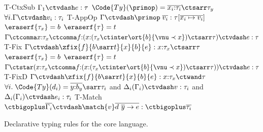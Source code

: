 \begin{figure}[h!]
{  {T-CtxSub}
  {$\Gamma_1 \ctvdash e : \tau$}
  \quad
  \mprooftr{34mm}
  {$\Code{Ty}(\primop) = \overline{x_i{:}\tau_i}\ctsarr \tau_y$ \quad 
    $\forall i. \Gamma \ctvdash v_i : \tau_i$ }
  {T-AppOp}
  {$\Gamma \ctvdash \primop\;\overline{v_i} : \tau[\overline{x_i \mapsto v_i}]$}
  \\[.8em]
  \mprooftr{64mm}
  {$\eraserf{\tau_x} = b$ \quad $\eraserf{\tau} = t$ \quad $\Gamma \ctcomma x{:}\tau_x \ctcomma f{:}(x{:}(\tau_x \ctinter \ort{b}{\vnu \prec x} ) \ctsarr \tau) \ctvdash e : \tau$}
  {T-Fix}
  {$\Gamma \ctvdash \zfix{f}{b\sarr t}{x}{b}{e} : x{:}\tau_x \ctsarr \tau$}
  \\[.8em]
  \mprooftr{64mm}
  {$\eraserf{\tau_x} = b$ \quad $\eraserf{\tau} = t$ \quad  $\Gamma \ctstar (x{:}\tau_x \ctcomma f{:}(x{:}(\tau_x \ctinter \ort{b}{\vnu \prec x} ) \ctsarr \tau)) \ctvdash e : \tau$}
  {T-FixD}
  {$\Gamma \ctvdash \zfix{f}{b\sarr t}{x}{b}{e} : x{:}\tau_x \ctwand \tau$}
  \\[.8em]
  \mprooftr{74mm}
  {$\forall i.\;\Code{Ty}(d_i) = \overline{y{:}b_y}\sarr \tau_i$ and $\Delta_i(\Gamma_i) \ctvdash v : \tau_i$ and $\Delta_i(\Gamma_i) \ctvdash e_i : \tau_i$ }
  {T-Match}
  {$\ctbigoplus \overline{\Gamma_i} \ctvdash \match{v} \overline{d\ \overline{y} \to e}  : \ctbigoplus \overline{\tau_i}$}
  }
  \caption{Declarative typing rules for the core language.}
  \label{fig:declaritive-typing-rules}
  \vspace*{-.1in}
\end{figure}

